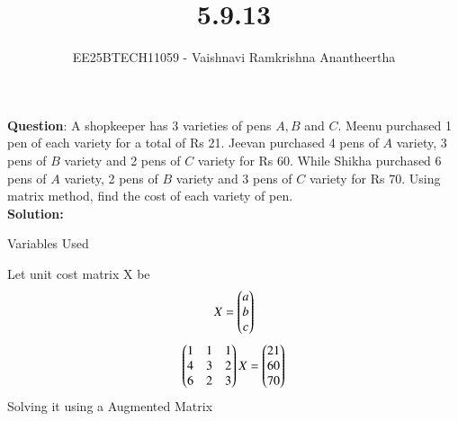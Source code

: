 \documentclass[journal]{IEEEtran}
\title{5.9.13}
\author{EE25BTECH11059 - Vaishnavi Ramkrishna Anantheertha}
\begin{document}
\maketitle

\renewcommand{\thefigure}{\theenumi}
\renewcommand{\thetable}{\theenumi}










\textbf{Question}:
A shopkeeper has 3 varieties of pens \( A, B \) and \( C \). Meenu purchased 1 pen of each variety for a total of Rs 21. Jeevan purchased 4 pens of \( A \) variety, 3 pens of \( B \) variety and 2 pens of \( C \) variety for Rs 60. While Shikha purchased 6 pens of \( A \) variety, 2 pens of \( B \) variety and 3 pens of \( C \) variety for Rs 70. Using matrix method, find the cost of each variety of pen.\\
\textbf{Solution: }\\
\begin{table}[H]    
  \centering
  
  \caption{Variables Used}
  \label{tab:1.10.25}
\end{table}
Let unit cost matrix X be 
\begin{align}
                                     X = \begin{pmatrix}
                                             a
                                              \\
                                              b
                                               \\
                                               c
                                              \end{pmatrix}
\end{align}
\begin{align}
 \begin{pmatrix}
        1 & 1 & 1
        \\
        4 & 3 & 2
        \\
        6 & 2 & 3
            \end{pmatrix}
X
=
\begin{pmatrix}
        21
        \\
        60
        \\
        70
        \end{pmatrix}
\end{align}
Solving it using a Augmented Matrix
\end{document}
